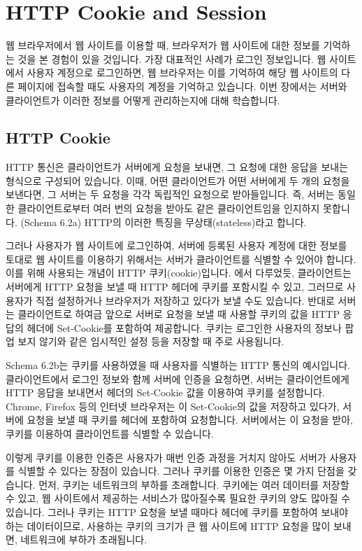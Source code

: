 \section{HTTP Cookie and Session}\label{sect:http-cookie-and-session}

웹 브라우저에서 웹 사이트를 이용할 때, 브라우저가 웹 사이트에 대한 정보를 기억하는 것을 본 경험이 있을 것입니다. 가장 대표적인 사례가 로그인 정보입니다. 웹 사이트에서 사용자 계정으로 로그인하면, 웹 브라우저는 이를 기억하여 해당 웹 사이트의 다른 페이지에 접속할 때도 사용자의 계정을 기억하고 있습니다. 이번 장에서는 서버와 클라이언트가 이러한 정보를 어떻게 관리하는지에 대해 학습합니다.

\subsection*{HTTP Cookie}

HTTP 통신은 클라이언트가 서버에게 요청을 보내면, 그 요청에 대한 응답을 보내는 형식으로 구성되어 있습니다. 이때, 어떤 클라이언트가 어떤 서버에게 두 개의 요청을 보낸다면, 그 서버는 두 요청을 각각 독립적인 요청으로 받아들입니다. 즉, 서버는 동일한 클라이언트로부터 여러 번의 요청을 받아도 같은 클라이언트임을 인지하지 못합니다. (Schema 6.2a) HTTP의 이러한 특징을 무상태(stateless)라고 합니다.

그러나 사용자가 웹 사이트에 로그인하여, 서버에 등록된 사용자 계정에 대한 정보를 토대로 웹 사이트를 이용하기 위해서는 서버가 클라이언트를 식별할 수 있어야 합니다. 이를 위해 사용되는 개념이 HTTP 쿠키(cookie)입니다. 에서 다루었듯, 클라이언트는 서버에게 HTTP 요청을 보낼 때 HTTP 헤더에 쿠키를 포함시킬 수 있고, 그러므로 사용자가 직접 설정하거나 브라우저가 저장하고 있다가 보낼 수도 있습니다. 반대로 서버는 클라이언트로 하여금 앞으로 서버로 요청을 보낼 때 사용할 쿠키의 값을 HTTP 응답의 헤더에 Set-Cookie를 포함하여 제공합니다. 쿠키는 로그인한 사용자의 정보나 팝업 보지 않기와 같은 임시적인 설정 등을 저장할 때 주로 사용됩니다.

Schema 6.2b는 쿠키를 사용하였을 때 사용자를 식별하는 HTTP 통신의 예시입니다. 클라이언트에서 로그인 정보와 함께 서버에 인증을 요청하면, 서버는 클라이언트에게 HTTP 응답을 보내면서 헤더의 Set-Cookie 값을 이용하여 쿠키를 설정합니다. Chrome, Firefox 등의 인터넷 브라우저는 이 Set-Cookie의 값을 저장하고 있다가, 서버에 요청을 보낼 때 쿠키를 헤더에 포함하여 요청합니다. 서버에서는 이 요청을 받아, 쿠키를 이용하여 클라이언트를 식별할 수 있습니다.

이렇게 쿠키를 이용한 인증은 사용자가 매번 인증 과정을 거치지 않아도 서버가 사용자를 식별할 수 있다는 장점이 있습니다. 그러나 쿠키를 이용한 인증은 몇 가지 단점을 갖습니다. 먼저, 쿠키는 네트워크의 부하를 초래합니다. 쿠키에는 여러 데이터를 저장할 수 있고, 웹 사이트에서 제공하는 서비스가 많아질수록 필요한 쿠키의 양도 많아질 수 있습니다. 그러나 쿠키는 HTTP 요청을 보낼 때마다 헤더에 쿠키를 포함하여 보내야 하는 데이터이므로, 사용하는 쿠키의 크기가 큰 웹 사이트에 HTTP 요청을 많이 보내면, 네트워크에 부하가 초래됩니다.

